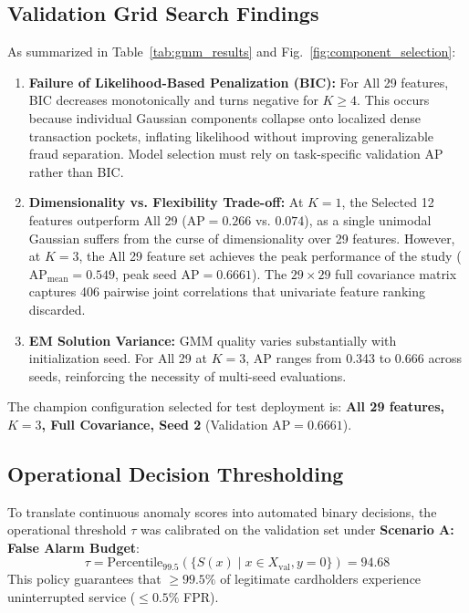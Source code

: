 \documentclass[10pt,journal,compsoc]{IEEEtran}
\begin{document}
\subsection{Validation Grid Search Findings}
As summarized in Table~\ref{tab:gmm_results} and Fig.~\ref{fig:component_selection}:
\begin{enumerate}
    \item \textbf{Failure of Likelihood-Based Penalization (BIC):} For All 29 features, BIC decreases monotonically and turns negative for $K \ge 4$. This occurs because individual Gaussian components collapse onto localized dense transaction pockets, inflating likelihood without improving generalizable fraud separation. Model selection must rely on task-specific validation AP rather than BIC.
    \item \textbf{Dimensionality vs. Flexibility Trade-off:} At $K=1$, the Selected 12 features outperform All 29 ($\text{AP} = 0.266$ vs. $0.074$), as a single unimodal Gaussian suffers from the curse of dimensionality over 29 features. However, at $K=3$, the All 29 feature set achieves the peak performance of the study ($\text{AP}_{\text{mean}} = 0.549$, peak seed $\text{AP} = 0.6661$). The $29 \times 29$ full covariance matrix captures 406 pairwise joint correlations that univariate feature ranking discarded.
    \item \textbf{EM Solution Variance:} GMM quality varies substantially with initialization seed. For All 29 at $K=3$, AP ranges from 0.343 to 0.666 across seeds, reinforcing the necessity of multi-seed evaluations.
\end{enumerate}

The champion configuration selected for test deployment is: \textbf{All 29 features, $K=3$, Full Covariance, Seed 2} (Validation $\text{AP} = 0.6661$).

\subsection{Operational Decision Thresholding}
To translate continuous anomaly scores into automated binary decisions, the operational threshold $\tau$ was calibrated on the validation set under \textbf{Scenario A: False Alarm Budget}:
\begin{equation}
\tau = \text{Percentile}_{99.5} \left( \{ S(x) \mid x \in X_{\text{val}}, y = 0 \} \right) = 94.68
\end{equation}
This policy guarantees that $\ge 99.5\%$ of legitimate cardholders experience uninterrupted service ($\le 0.5\%$ FPR).
\end{document}
